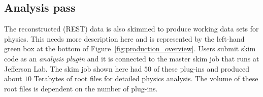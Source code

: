 \subsection{Analysis pass \label{sec:recanalysis}}

The reconstructed (REST) data is also skimmed to produce working data sets for physics. This needs more description here and is represented by the left-hand
green box at the bottom of Figure~\ref{fig:production_overview}. Users submit skim code as an \emph{analysis plugin} and it is connected to the master skim job that runs at Jefferson Lab. The skim job shown here had $50$ of these plug-ins and produced about $10$ Terabytes of root files for detailed physics analysis. The volume of these root files is dependent on the number of plug-ins.
